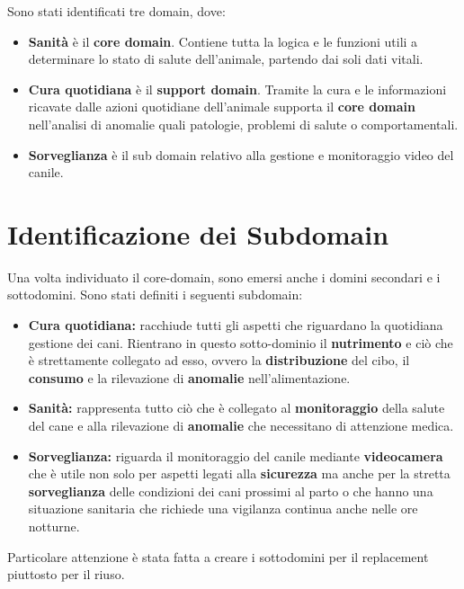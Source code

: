     Sono stati identificati tre domain, dove:
    \begin{itemize}
        \item \textbf{Sanità} è il \textbf{core domain}. Contiene tutta la logica e le funzioni utili a determinare lo stato di salute dell'animale, partendo dai soli dati vitali.
        
        \item \textbf{Cura quotidiana} è il \textbf{support domain}. Tramite la cura e le informazioni ricavate dalle azioni quotidiane dell'animale supporta il \textbf{core domain} nell'analisi di anomalie quali patologie, problemi di salute o comportamentali.
        
        \item \textbf{Sorveglianza} è il sub domain relativo alla gestione e monitoraggio video del canile.
    \end{itemize}
    
    \section{Identificazione dei Subdomain}
    Una volta individuato il core-domain, sono emersi anche i domini secondari e i sottodomini. 
    Sono stati definiti i seguenti subdomain:
    \begin{itemize}
        \item \textbf{Cura quotidiana:} racchiude tutti gli aspetti che riguardano la quotidiana gestione dei cani. Rientrano in questo sotto-dominio il \textbf{nutrimento} e ciò che è strettamente collegato ad esso, ovvero la \textbf{distribuzione} del cibo, il \textbf{consumo} e la rilevazione di \textbf{anomalie} nell'alimentazione.  
        \item \textbf{Sanità:} rappresenta tutto ciò che è collegato al \textbf{monitoraggio} della salute del cane e alla rilevazione di \textbf{anomalie} che necessitano di attenzione medica.
        \item \textbf{Sorveglianza:} riguarda il monitoraggio del canile mediante \textbf{videocamera} che è utile non solo per aspetti legati alla \textbf{sicurezza} ma anche per la stretta \textbf{sorveglianza} delle condizioni dei cani prossimi al parto o che hanno una situazione sanitaria che richiede una vigilanza continua anche nelle ore notturne.
    \end{itemize}
    Particolare attenzione è stata fatta a creare i sottodomini per il replacement piuttosto per il riuso.
    
